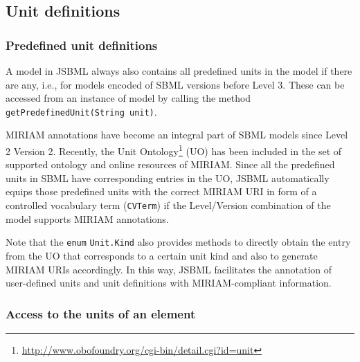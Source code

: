 \documentclass[
  BCOR12mm,
  letterpaper,
  11pt,
  headsepline,
  pointlessnumbers,
  tablecaptionabove,
  onelinecaption,
  headinclude,
  appendixprefix,
  idxtotoc,
  bibtotoc,
  twoside,
  titlepage
]{scrartcl}
\begin{document}
\subsection{Unit definitions}

\subsubsection{Predefined unit definitions}

A model in JSBML always also contains all predefined units in the model
if there are any, i.e., for models encoded of SBML versions before Level
3. These can be accessed from an instance of model by calling the method
\texttt{getPredefinedUnit(String unit)}.

MIRIAM annotations \citep{Novere2005} have become an integral part of SBML models
since Level 2 Version 2. Recently, the Unit
Ontology\footnote{\url{http://www.obofoundry.org/cgi-bin/detail.cgi?id=unit}}
(UO) has been included in the set of supported ontology and online resources of
MIRIAM. Since all the predefined units in SBML have corresponding entries in the
UO, JSBML automatically equips those predefined units with the correct MIRIAM
URI in form of a controlled vocabulary term (\texttt{CVTerm}) if the
Level/Version combination of the model supports MIRIAM annotations.

Note that the \texttt{enum} \texttt{Unit.Kind}
 also provides
methods to directly
obtain the entry from the UO that corresponds to a certain unit kind and also to
generate MIRIAM URIs accordingly. In this way, JSBML facilitates the annotation
of user-defined units and unit definitions with MIRIAM-compliant information.

\subsubsection{Access to the units of an element}
\end{document}
